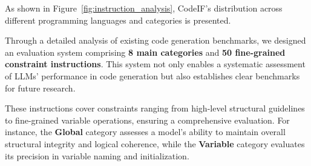 


As shown in Figure~\ref{fig:instruction_analysis}, CodeIF's distribution across different programming languages and categories is presented.

Through a detailed analysis of existing code generation benchmarks, we designed an evaluation system comprising \textbf{8 main categories} and \textbf{50 fine-grained constraint instructions}. This system not only enables a systematic assessment of LLMs' performance in code generation but also establishes clear benchmarks for future research.

These instructions cover constraints ranging from high-level structural guidelines to fine-grained variable operations, ensuring a comprehensive evaluation. For instance, the \textbf{Global} category assesses a model’s ability to maintain overall structural integrity and logical coherence, while the \textbf{Variable} category evaluates its precision in variable naming and initialization.

